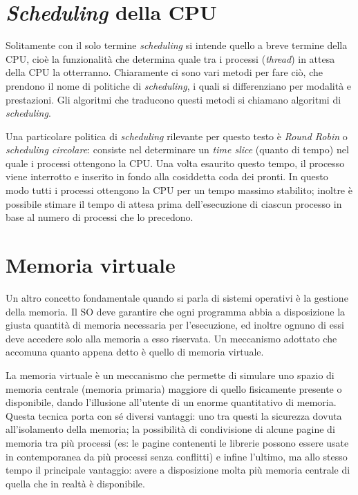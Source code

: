\section{\textit{\uppercase{s}cheduling} della CPU}
Solitamente con il solo termine \textit{scheduling} si intende quello a breve termine della CPU, cioè la funzionalità che determina quale tra i processi (\textit{thread}) in attesa della CPU la otterranno. Chiaramente ci sono vari metodi per fare ciò, che prendono il nome di politiche di \textit{scheduling}, i quali si differenziano per modalità e prestazioni. Gli algoritmi che traducono questi metodi si chiamano algoritmi di \textit{scheduling}.

Una particolare politica di \textit{scheduling} rilevante per questo testo è \textit{Round Robin} o \textit{scheduling circolare}: consiste nel determinare un \textit{time slice} (quanto di tempo) nel quale i processi ottengono la CPU. Una volta esaurito questo tempo, il processo viene interrotto e inserito in fondo alla cosiddetta coda dei pronti. In questo modo tutti i processi ottengono la CPU per un tempo massimo stabilito; inoltre è possibile stimare il tempo di attesa prima dell'esecuzione di ciascun processo in base al numero di processi che lo precedono.

\section{Memoria virtuale}
Un altro concetto fondamentale quando si parla di sistemi operativi è la gestione della memoria. Il SO deve garantire che ogni programma abbia a disposizione la giusta quantità di memoria necessaria per l'esecuzione, ed inoltre ognuno di essi deve accedere solo alla memoria a esso riservata. Un meccanismo adottato che accomuna quanto appena detto è quello di memoria virtuale.

La memoria virtuale è un meccanismo che permette di simulare uno spazio di memoria centrale (memoria primaria) maggiore di quello fisicamente presente o disponibile, dando l'illusione all'utente di un enorme quantitativo di memoria. Questa tecnica porta con sé diversi vantaggi: uno tra questi la sicurezza dovuta all'isolamento della memoria; la possibilità di condivisione di alcune pagine di memoria tra più processi (es: le pagine contenenti le librerie possono essere usate in contemporanea da più processi senza conflitti) e infine l'ultimo, ma allo stesso tempo il principale vantaggio: avere a disposizione molta più memoria centrale di quella che in realtà è disponibile. 

